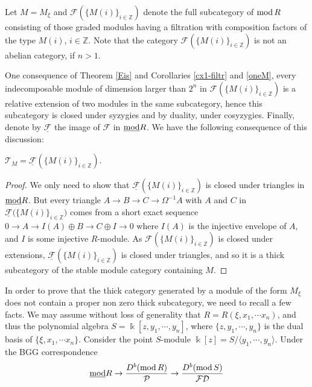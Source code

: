 \documentclass[10pt]{amsart}
\begin{document}
\noindent Let $M=M_{\xi}$ and ${\mathcal F}(\{M(i)\}_{i\in\mathbb Z})$ denote the full 
subcategory of $\operatorname{mod} R$ consisting of those graded modules 
having a filtration with composition factors of the type $M(i)$, $i\in\mathbb Z$. Note that the category ${\mathcal F}(\{M(i)\}_{i\in\mathbb Z})$ is not an abelian category, if $n>1$.
\medskip

\noindent One consequence of  Theorem \ref{Eis} and Corollaries \ref{cx1-filtr} and \ref{oneM},
 every indecomposable module of dimension larger 
than $2^n$ in ${\mathcal F}(\{M(i)\}_{i\in\mathbb Z})$ is a relative extension of two modules 
in the same subcategory, hence this subcategory is closed under syzygies and by duality, 
under cosyzygies. Finally, denote by $\underline{\mathcal F}$ the image of $\mathcal F$ in 
$\underline{\operatorname{mod}} R$. 
 We have the following consequence of this discussion:
 
\begin{prop} $\mathcal T_M=\underline{\mathcal F}(\{M(i)\}_{i\in\mathbb Z})$. 
\end{prop}
\begin{proof} We only need to show that $\underline{\mathcal F}(\{M(i)\}_{i\in\mathbb Z})$ is closed 
under triangles in $\underline{\operatorname{mod}} R$. But every triangle 
$A\rightarrow B\rightarrow C\rightarrow\Omega^{-1}A$ with $A$ and $C$ in 
$\underline{\mathcal F}({\{M(i)\}_{i\in\mathbb Z})}$ comes from a short 
exact sequence $0\rightarrow A\rightarrow I(A)\oplus B\rightarrow C\oplus I\rightarrow 0$ 
where $I(A)$ is the injective envelope of $A$, and $I$ is some injective $R$-module. As ${\mathcal F}(\{M(i)\}_{i\in\mathbb Z})$ 
is closed under extensions, $\underline{\mathcal F}(\{M(i)\}_{i\in\mathbb Z})$ is  
closed under triangles, and so it is a thick subcategory of the stable module 
category containing $M$.
\end{proof}


 \noindent In order to prove that the thick category generated by a module of the form
$M_{\xi}$ does not contain a proper non zero thick subcategory, we need to recall a few facts. We may assume without loss of generality that $R=R(\xi,x_1,\cdots x_n)$, and thus the polynomial algebra $S=\Bbbk[z,y_1,\cdots,y_n]$, where $\{z,y_1,\cdots,y_n\}$ is the dual basis of $\{\xi,x_1,\cdots x_n\}$. Consider the point $S$-module $\Bbbk[z]=S/{\langle y_1,\cdots,y_n\rangle}$. Under the BGG correspondence 
$$\underline{\operatorname{mod}} R\rightarrow\dfrac{D^b(\operatorname{mod} R)}{\mathcal P}\rightarrow\dfrac{D^b(\operatorname{mod} S)}{\mathcal {FD}} $$
\end{document}
